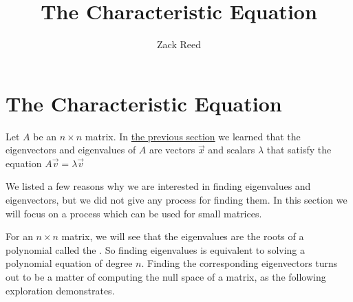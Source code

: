 \documentclass{ximera}
\author{Zack Reed}
\title{The Characteristic Equation}
\begin{document}
\begin{abstract}

\end{abstract}
\maketitle


\section*{The Characteristic Equation}

    
Let $A$ be an $n \times n$ matrix.  In \href{https://ximera.osu.edu/appliedlinearalgebra/c7ChapterSeven/learningActivities/m7LearningActivities/m7EigenStuff/describingEigenstuff}{the previous section} we learned that the eigenvectors and eigenvalues of $A$ are vectors $\vec{x}$ and scalars $\lambda$ that satisfy the equation 
$A \vec{v} = \lambda \vec{v}$

We listed a few reasons why we are interested in finding eigenvalues and eigenvectors, but we did not give any process for finding them.  In this section we will focus on a process which can be used for small matrices.  %
    
For an $n \times n$ matrix, we will see that the eigenvalues are the roots of a polynomial called the .  So finding eigenvalues is equivalent to solving a polynomial equation of degree $n$.  Finding the corresponding eigenvectors turns out to be a matter of computing the null space of a matrix, as the following exploration demonstrates.
    
\end{document}

